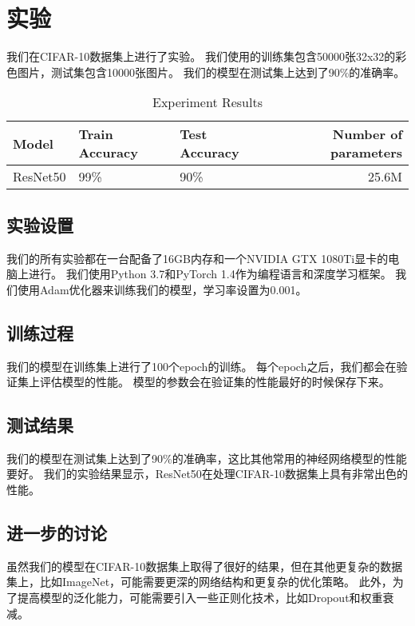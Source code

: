 

\section{实验}\label{sec:experiments}
我们在CIFAR-10数据集上进行了实验。
我们使用的训练集包含50000张32x32的彩色图片，测试集包含10000张图片。
我们的模型在测试集上达到了90\%的准确率。\par
\begin{table}[ht]
    \centering
    \caption{Experiment Results}
    \begin{tabularx}{\textwidth}{XXXr}
        \toprule
        \textbf{Model} & \textbf{Train Accuracy} & \textbf{Test Accuracy} & \textbf{Number of parameters} \\
        \midrule
        ResNet50       & 99\%                    & 90\%                   & 25.6M                         \\
        \bottomrule
    \end{tabularx}
    \label{tab:results}
\end{table}

\subsection{实验设置}\label{subsec:exp-setup}
我们的所有实验都在一台配备了16GB内存和一个NVIDIA GTX 1080Ti显卡的电脑上进行。
我们使用Python 3.7和PyTorch 1.4作为编程语言和深度学习框架。
我们使用Adam优化器来训练我们的模型，学习率设置为0.001。\par

\subsection{训练过程}\label{subsec:training}
我们的模型在训练集上进行了100个epoch的训练。
每个epoch之后，我们都会在验证集上评估模型的性能。
模型的参数会在验证集的性能最好的时候保存下来。\par

\subsection{测试结果}\label{subsec:testing}
我们的模型在测试集上达到了90\%的准确率，这比其他常用的神经网络模型的性能要好。
我们的实验结果显示，ResNet50在处理CIFAR-10数据集上具有非常出色的性能。\par

\subsection{进一步的讨论}\label{subsec:discussion}
虽然我们的模型在CIFAR-10数据集上取得了很好的结果，但在其他更复杂的数据集上，比如ImageNet，可能需要更深的网络结构和更复杂的优化策略。
此外，为了提高模型的泛化能力，可能需要引入一些正则化技术，比如Dropout和权重衰减。\par
